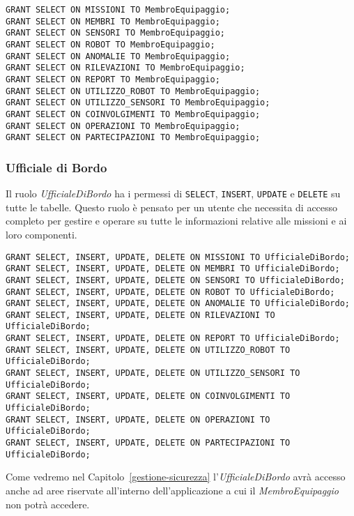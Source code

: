 \begin{lstlisting}
GRANT SELECT ON MISSIONI TO MembroEquipaggio;
GRANT SELECT ON MEMBRI TO MembroEquipaggio;
GRANT SELECT ON SENSORI TO MembroEquipaggio;
GRANT SELECT ON ROBOT TO MembroEquipaggio;
GRANT SELECT ON ANOMALIE TO MembroEquipaggio;
GRANT SELECT ON RILEVAZIONI TO MembroEquipaggio;
GRANT SELECT ON REPORT TO MembroEquipaggio;
GRANT SELECT ON UTILIZZO_ROBOT TO MembroEquipaggio;
GRANT SELECT ON UTILIZZO_SENSORI TO MembroEquipaggio;
GRANT SELECT ON COINVOLGIMENTI TO MembroEquipaggio;
GRANT SELECT ON OPERAZIONI TO MembroEquipaggio;
GRANT SELECT ON PARTECIPAZIONI TO MembroEquipaggio;
\end{lstlisting}

\subsubsection{Ufficiale di Bordo}
Il ruolo \textit{UfficialeDiBordo} ha i permessi di \texttt{SELECT}, \texttt{INSERT}, \texttt{UPDATE} e \texttt{DELETE} su tutte le tabelle.
Questo ruolo è pensato per un utente che necessita di accesso completo per gestire e operare su tutte le informazioni relative alle missioni e ai loro componenti.

\begin{lstlisting}
GRANT SELECT, INSERT, UPDATE, DELETE ON MISSIONI TO UfficialeDiBordo;
GRANT SELECT, INSERT, UPDATE, DELETE ON MEMBRI TO UfficialeDiBordo;
GRANT SELECT, INSERT, UPDATE, DELETE ON SENSORI TO UfficialeDiBordo;
GRANT SELECT, INSERT, UPDATE, DELETE ON ROBOT TO UfficialeDiBordo;
GRANT SELECT, INSERT, UPDATE, DELETE ON ANOMALIE TO UfficialeDiBordo;
GRANT SELECT, INSERT, UPDATE, DELETE ON RILEVAZIONI TO UfficialeDiBordo;
GRANT SELECT, INSERT, UPDATE, DELETE ON REPORT TO UfficialeDiBordo;
GRANT SELECT, INSERT, UPDATE, DELETE ON UTILIZZO_ROBOT TO UfficialeDiBordo;
GRANT SELECT, INSERT, UPDATE, DELETE ON UTILIZZO_SENSORI TO UfficialeDiBordo;
GRANT SELECT, INSERT, UPDATE, DELETE ON COINVOLGIMENTI TO UfficialeDiBordo;
GRANT SELECT, INSERT, UPDATE, DELETE ON OPERAZIONI TO UfficialeDiBordo;
GRANT SELECT, INSERT, UPDATE, DELETE ON PARTECIPAZIONI TO UfficialeDiBordo;
\end{lstlisting}
\noindent
Come vedremo nel Capitolo~\ref{gestione-sicurezza} l'\textit{UfficialeDiBordo} avrà accesso anche ad aree riservate all'interno dell'applicazione a cui il \textit{MembroEquipaggio} non potrà accedere.